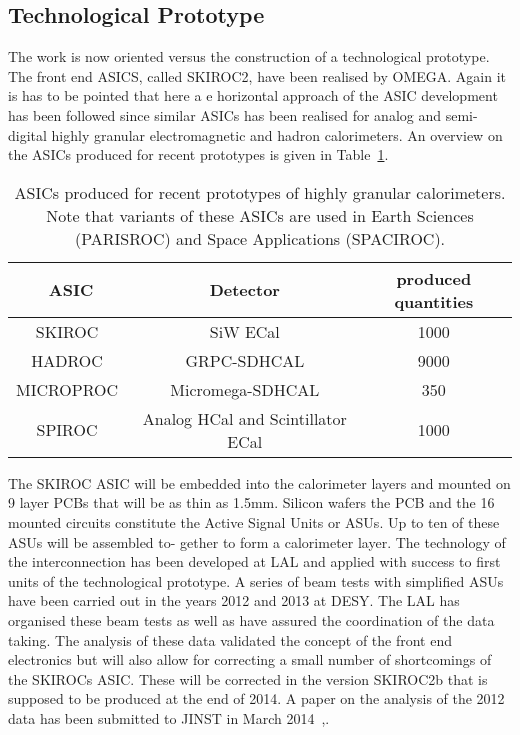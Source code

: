 \subsection{Technological Prototype}
The work is now oriented versus the construction of a technological prototype. The front end ASICS, called SKIROC2, have been realised by OMEGA. Again it is has to be pointed that here a e horizontal approach of the ASIC development has been followed since similar ASICs has been realised for analog and semi-digital highly granular electromagnetic and hadron calorimeters. An overview on the ASICs produced for recent prototypes is given in Table~\ref{tab:LALElectronics}.
\begin{table}
\caption{ASICs produced for recent prototypes of highly granular calorimeters. Note that variants of these ASICs are used in Earth Sciences (PARISROC) and Space Applications (SPACIROC).}
\label{tab:LALElectronics}
\begin{tabular}{|c|c|c|}
	\hline
	ASIC & Detector & produced quantities \\
	\hline
	SKIROC~\cite{1748-0221-6-12-C12040} & SiW ECal & 1000 \\
	HADROC~\cite{5874060} & GRPC-SDHCAL & 9000 \\
	MICROPROC~\cite{1748-0221-7-01-C01029} & Micromega-SDHCAL & 350 \\
	SPIROC~\cite{1748-0221-8-01-C01027} & Analog HCal and Scintillator ECal & 1000 \\
	\hline
\end{tabular}
\end{table}
The SKIROC ASIC will be embedded into the calorimeter layers and mounted on 9 layer PCBs that will be as thin as 1.5mm. Silicon wafers the PCB and the 16 mounted circuits constitute the Active Signal Units or ASUs. Up to ten of these ASUs will be assembled to- gether to form a calorimeter layer. The technology of the interconnection has been developed at LAL and applied with success to first units of the technological prototype.
A series of beam tests with simplified ASUs have been carried out in the years 2012 and 2013 at DESY. The LAL has organised these beam tests as well as have assured the coordination of the data taking. The analysis of these data validated the concept of the front end electronics but will also allow for correcting a small number of shortcomings of the SKIROCs ASIC. These will be corrected in the version SKIROC2b that is supposed to be produced at the end of 2014. A paper on the analysis of the 2012 data has been submitted to JINST in March 2014~\cite{Rouene2013470},\cite{Frisson:2013:CIN023}.
